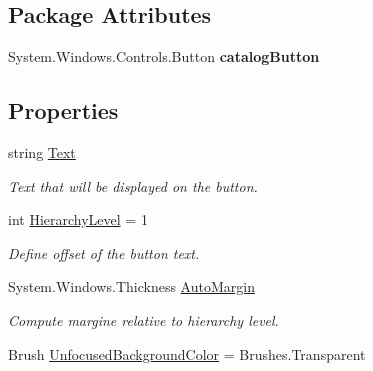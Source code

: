\subsection*{Package Attributes}
\begin{DoxyCompactItemize}
\item 
\mbox{\label{class_teacher_handbook_1_1_controls_1_1_catalog_button_ae45079c15cbf261f88829dba291174b0}} 
System.\+Windows.\+Controls.\+Button {\bfseries catalog\+Button}
\end{DoxyCompactItemize}
\subsection*{Properties}
\begin{DoxyCompactItemize}
\item 
string \mbox{\hyperlink{class_teacher_handbook_1_1_controls_1_1_catalog_button_a6fb48124ad7934da63e34751399e46cf}{Text}}
\begin{DoxyCompactList}\small\item\em Text that will be displayed on the button. \end{DoxyCompactList}\item 
int \mbox{\hyperlink{class_teacher_handbook_1_1_controls_1_1_catalog_button_a9dbed6d9494449cc23129322ff646556}{Hierarchy\+Level}} = 1
\begin{DoxyCompactList}\small\item\em Define offset of the button text. \end{DoxyCompactList}\item 
System.\+Windows.\+Thickness \mbox{\hyperlink{class_teacher_handbook_1_1_controls_1_1_catalog_button_a4b27c513e1e4c2d0f3e0dab6bfeb2715}{Auto\+Margin}}
\begin{DoxyCompactList}\small\item\em Compute margine relative to hierarchy level. \end{DoxyCompactList}\item 
Brush \mbox{\hyperlink{class_teacher_handbook_1_1_controls_1_1_catalog_button_ae7b4076398961a53d064acc431f071b3}{Unfocused\+Background\+Color}} = Brushes.\+Transparent

\end{DoxyCompactItemize}
